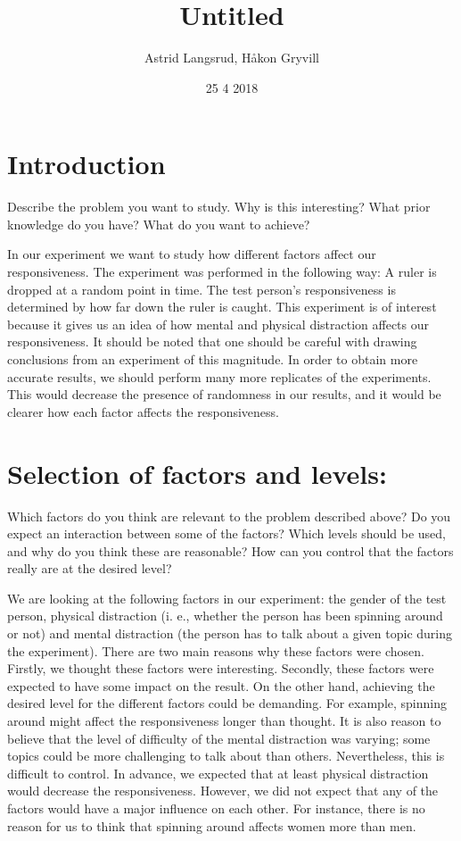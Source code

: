 \documentclass[]{article}
\title{Untitled}
\author{Astrid Langsrud, Håkon Gryvill}
\date{25 4 2018}
\begin{document}
\maketitle

\section{Introduction}\label{introduction}

Describe the problem you want to study. Why is this interesting? What
prior knowledge do you have? What do you want to achieve?

In our experiment we want to study how different factors affect our
responsiveness. The experiment was performed in the following way: A
ruler is dropped at a random point in time. The test person's
responsiveness is determined by how far down the ruler is caught. This
experiment is of interest because it gives us an idea of how mental and
physical distraction affects our responsiveness. It should be noted that
one should be careful with drawing conclusions from an experiment of
this magnitude. In order to obtain more accurate results, we should
perform many more replicates of the experiments. This would decrease the
presence of randomness in our results, and it would be clearer how each
factor affects the responsiveness.

\section{Selection of factors and
levels:}\label{selection-of-factors-and-levels}

Which factors do you think are relevant to the problem described above?
Do you expect an interaction between some of the factors? Which levels
should be used, and why do you think these are reasonable? How can you
control that the factors really are at the desired level?

We are looking at the following factors in our experiment: the gender of
the test person, physical distraction (i. e., whether the person has
been spinning around or not) and mental distraction (the person has to
talk about a given topic during the experiment). There are two main
reasons why these factors were chosen. Firstly, we thought these factors
were interesting. Secondly, these factors were expected to have some
impact on the result. On the other hand, achieving the desired level for
the different factors could be demanding. For example, spinning around
might affect the responsiveness longer than thought. It is also reason
to believe that the level of difficulty of the mental distraction was
varying; some topics could be more challenging to talk about than
others. Nevertheless, this is difficult to control. In advance, we
expected that at least physical distraction would decrease the
responsiveness. However, we did not expect that any of the factors would
have a major influence on each other. For instance, there is no reason
for us to think that spinning around affects women more than men.
\end{document}
